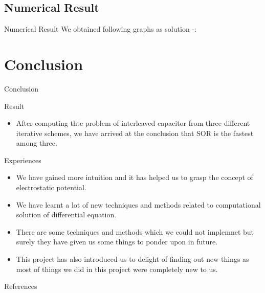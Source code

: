 \documentclass[9 pt]{beamer}
\begin{document}
				\subsection{Numerical Result}
				\begin{frame}{Numerical Result}
					We obtained following graphs as solution -: \\
					
				\end{frame}
				\section{Conclusion}
					\begin{frame}{Conclusion}
						\begin{block}{Result}
							\begin{itemize}
								\item After computing thte problem of interleaved capacitor from three different iterative schemes, we have arrived at the conclusion that SOR is the fastest among three.
							\end{itemize}
							\end{block}
						\begin{block}{Experiences}
							\begin{itemize}
								\item We have gained more intuition and it has helped us to grasp the concept of electrostatic potential.
								\item We have learnt a lot of new techniques and methods related to computational solution of differential equation.
								\item There are some techniques and methods which we could not implemnet  but surely they have given us some things to ponder upon in future.
								\item This project has also  introduced us to delight of finding out new things as most of things we did in this project were completely new to us.
							\end{itemize}
						\end{block}
							
					\end{frame}
				\begin{frame}{References}
					\nocite{*}
					\printbibliography[heading=none]
				\end{frame}
\end{document}

